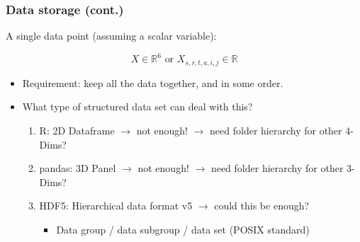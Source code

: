 \documentclass[9pt,sansserif]{beamer}
\newlength{\parskipbackup}
\newlength{\parindentbackup}
\let\notebackup\note
\renewcommand{\note}[1]{\notebackup{%
	\mode<handout>{\addtocounter{page}{-1}}%
	\setlength{\parindent}{0ex}%
	\setlength{\parskip}{10pt}%
	\noindent%
	{\normalsize{}#1}%
	\setlength{\parskip}{\parskipbackup}%
	\setlength{\parindent}{\parindentbackup}%
}%
}
\begin{document}
\begin{frame}{}\small
\frametitle{Data storage (cont.)}

\vspace{1cm}
A single data point (assuming a scalar variable):

{\Large
\begin{equation*}
X \in \mathbb{R}^6 \text{   or   }
X_{s,r,t,a,i,j} \in \mathbb{R}
\end{equation*}}

\bigskip
\begin{itemize}\itemsep1em
\item Requirement: keep all the data together, and in some order.

\item What type of structured data set can deal with this?\\ [5pt]

\begin{enumerate}\itemsep2em

\item {} R: 2D Dataframe $\rightarrow$ not enough! $\rightarrow$ need folder hierarchy for other 4-Dims?

\item {} pandas: 3D Panel $\rightarrow$ not enough!  $\rightarrow$ need folder hierarchy for other 3-Dims?

\item {} HDF5: Hierarchical data format v5  $\rightarrow$ could this be enough? 
\begin{itemize}
\item {} Data group / data subgroup / data set (POSIX standard)
\end{itemize}

\end{enumerate}
\end{itemize}

\end{frame}
\note{
}

\end{document}
